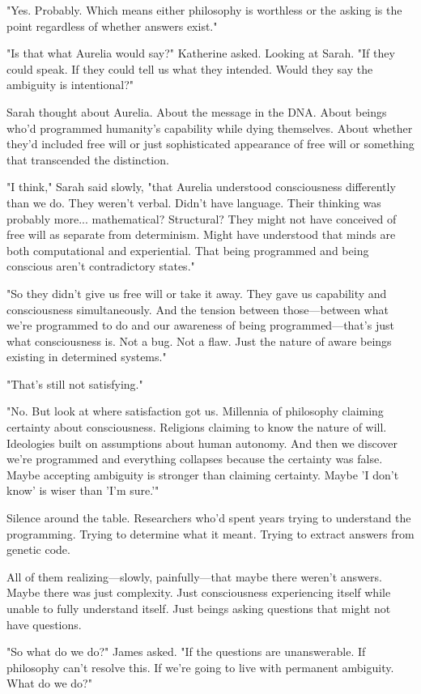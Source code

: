 "Yes. Probably. Which means either philosophy is worthless or the asking is the point regardless of whether answers exist."

"Is that what Aurelia would say?" Katherine asked. Looking at Sarah. "If they could speak. If they could tell us what they intended. Would they say the ambiguity is intentional?"

Sarah thought about Aurelia. About the message in the DNA. About beings who'd programmed humanity's capability while dying themselves. About whether they'd included free will or just sophisticated appearance of free will or something that transcended the distinction.

"I think," Sarah said slowly, "that Aurelia understood consciousness differently than we do. They weren't verbal. Didn't have language. Their thinking was probably more... mathematical? Structural? They might not have conceived of free will as separate from determinism. Might have understood that minds are both computational and experiential. That being programmed and being conscious aren't contradictory states."

"So they didn't give us free will or take it away. They gave us capability and consciousness simultaneously. And the tension between those—between what we're programmed to do and our awareness of being programmed—that's just what consciousness is. Not a bug. Not a flaw. Just the nature of aware beings existing in determined systems."

"That's still not satisfying."

"No. But look at where satisfaction got us. Millennia of philosophy claiming certainty about consciousness. Religions claiming to know the nature of will. Ideologies built on assumptions about human autonomy. And then we discover we're programmed and everything collapses because the certainty was false. Maybe accepting ambiguity is stronger than claiming certainty. Maybe 'I don't know' is wiser than 'I'm sure.'"

Silence around the table. Researchers who'd spent years trying to understand the programming. Trying to determine what it meant. Trying to extract answers from genetic code.

All of them realizing—slowly, painfully—that maybe there weren't answers. Maybe there was just complexity. Just consciousness experiencing itself while unable to fully understand itself. Just beings asking questions that might not have questions.

"So what do we do?" James asked. "If the questions are unanswerable. If philosophy can't resolve this. If we're going to live with permanent ambiguity. What do we do?"

